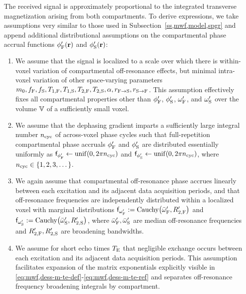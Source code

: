 The received signal is approximately proportional
to the integrated transverse magnetization
arising from both compartments.
To derive expressions,
we take assumptions very similar 
to those used in Subsection~\ref{ss,mwf,model,spgr}
and append additional distributional assumptions
on the compartmental phase accrual functions 
$\phipf\pr$ and $\phips\pr$:
\begin{enumerate}
	\item We assume that the signal is localized
		to a scale over which there is within-voxel variation
		of compartmental off-resonance effects, 
		but minimal intra-voxel variation 
		of other space-varying parameters
		$m_0, f_{\mathrm{F}}, f_{\mathrm{S}}, T_{1,\mathrm{F}}, T_{1,\mathrm{S}}, T_{2,\mathrm{F}}, T_{2,\mathrm{S}}, \alpha, r_{\mathrm{F}\to\mathrm{S}}, r_{\mathrm{S}\to\mathrm{F}}$.
		This assumption effectively fixes all compartmental properties
		other than $\phi'_{\mathrm{F}}$, $\phi'_{\mathrm{S}}$, $\omega'_{\mathrm{F}}$, and $\omega'_{\mathrm{S}}$
		over the volume $\mathbb{V}$ 
		of a sufficiently small voxel.
		\label{item:dess,int} 
		
	\item
		We assume 
		that the dephasing gradient imparts 
		a sufficiently large integral number $n_\mathrm{cyc}$ 
		of across-voxel phase cycles
		such that full-repetition compartmental phase accruals
		$\phi'_{\mathrm{F}}$ and $\phi'_{\mathrm{S}}$ 
		are distributed essentially uniformly
		as $\dist{\phipf} \gets \unif{0,2\pi\cyc}$ 
		and $\dist{\phips} \gets \unif{0,2\pi\cyc}$, 
		where $\cyc \in \set{1,2,3,\dots}$.
		\label{item:dess,ph}
		
	\item 
		We again assume
		that compartmental off-resonance phase accrues linearly
		between each excitation 
		and its adjacent data acquisition periods,
		and that off-resonance frequencies
		are independently distributed 
		within a localized voxel 
		with marginal distributions
		$\dist{\ompf} := \operatorname{Cauchy}\paren{\ompfmed,\Rtpf}$
		and $\dist{\omps} := \operatorname{Cauchy}\paren{\ompsmed,\Rtps}$,
		where $\bar{\omega}_{\mathrm{F}}',\bar{\omega}_{\mathrm{S}}'$ are median off-resonance frequencies
		and $R_{2,\mathrm{F}}',R_{2,\mathrm{S}}'$ are broadening bandwidths.
		\label{item:dess,freq}
		
	\item 
		We assume 
		for short echo times $T_\mathrm{E}$
		that negligible exchange occurs
		between each excitation 
		and its adjacent data acquisition periods.
		This assumption facilitates expansion 
		of the matrix exponentials
		explicitly visible 
		in \eqref{eq:mwf,dess-m-te-def}-\eqref{eq:mwf,dess-m-te-ref}
		and separates off-resonance frequency broadening integrals
		by compartment.
		\label{item:dess,exchg0}
\end{enumerate}
